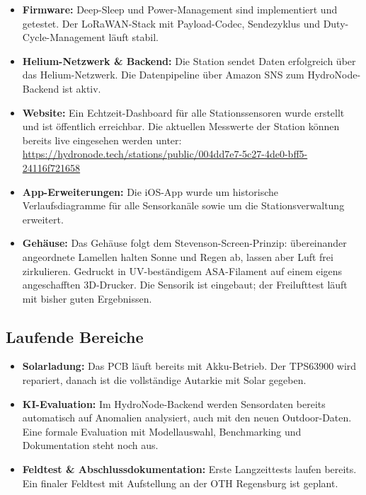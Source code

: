 \documentclass[11pt,a4paper]{scrartcl}
\begin{document}
\begin{itemize}
  \item \textbf{Firmware:} Deep-Sleep und Power-Management sind implementiert und
        getestet. Der LoRaWAN-Stack mit Payload-Codec, Sendezyklus und
        Duty-Cycle-Management läuft stabil.

  \item \textbf{Helium-Netzwerk \& Backend:} Die Station sendet Daten erfolgreich
        über das Helium-Netzwerk. Die Datenpipeline über Amazon SNS zum HydroNode-
        Backend ist aktiv.

  \item \textbf{Website:} Ein Echtzeit-Dashboard für alle Stationssensoren wurde
        erstellt und ist öffentlich erreichbar. Die aktuellen Messwerte der Station
        können bereits live eingesehen werden unter:\\
        \url{https://hydronode.tech/stations/public/004dd7e7-5c27-4de0-bff5-24116f721658}

  \item \textbf{App-Erweiterungen:} Die iOS-App wurde um historische Verlaufsdiagramme
        für alle Sensorkanäle sowie um die Stationsverwaltung erweitert.

  \item \textbf{Gehäuse:} Das Gehäuse folgt dem Stevenson-Screen-Prinzip: übereinander
        angeordnete Lamellen halten Sonne und Regen ab, lassen aber Luft frei
        zirkulieren. Gedruckt in UV-beständigem ASA-Filament auf einem eigens
        angeschafften 3D-Drucker. Die Sensorik ist eingebaut; der Freilufttest läuft
        mit bisher guten Ergebnissen.
\end{itemize}

\subsection{Laufende Bereiche}

\begin{itemize}
  \item \textbf{Solarladung:} Das PCB läuft bereits mit Akku-Betrieb. Der TPS63900
        wird repariert, danach ist die vollständige Autarkie mit Solar gegeben.

  \item \textbf{KI-Evaluation:} Im HydroNode-Backend werden Sensordaten bereits
        automatisch auf Anomalien analysiert, auch mit den neuen Outdoor-Daten.
        Eine formale Evaluation mit Modellauswahl, Benchmarking und Dokumentation
        steht noch aus.

  \item \textbf{Feldtest \& Abschlussdokumentation:} Erste Langzeittests laufen
        bereits. Ein finaler Feldtest mit Aufstellung an der OTH Regensburg ist geplant.
\end{itemize}
\end{document}
